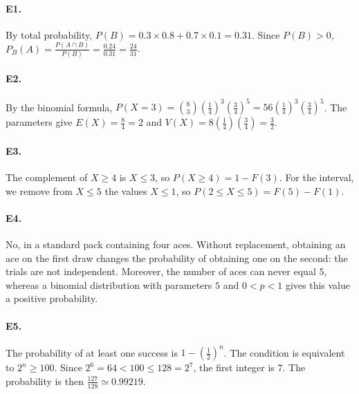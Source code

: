 \paragraph{E1.}By total probability, $P(B)=0.3\times0.8+0.7\times0.1=0.31$. Since $P(B)>0$, $P_B(A)=\frac{P(A\cap B)}{P(B)}=\frac{0.24}{0.31}=\frac{24}{31}$.

\paragraph{E2.}By the binomial formula, $P(X=3)=\binom{8}{3}(\frac{1}{4})^3(\frac{3}{4})^5=56(\frac{1}{4})^3(\frac{3}{4})^5$. The parameters give $E(X)=\frac{8}{4}=2$ and $V(X)=8(\frac{1}{4})(\frac{3}{4})=\frac{3}{2}$.

\paragraph{E3.}The complement of $X\ge4$ is $X\le3$, so $P(X\ge4)=1-F(3)$. For the interval, we remove from $X\le5$ the values $X\le1$, so $P(2\le X\le5)=F(5)-F(1)$.

\paragraph{E4.}No, in a standard pack containing four aces. Without replacement, obtaining an ace on the first draw changes the probability of obtaining one on the second: the trials are not independent. Moreover, the number of aces can never equal $5$, whereas a binomial distribution with parameters $5$ and $0<p<1$ gives this value a positive probability.

\paragraph{E5.}The probability of at least one success is $1-(\frac{1}{2})^n$. The condition is equivalent to $2^n\ge100$. Since $2^6=64<100\le128=2^7$, the first integer is $7$. The probability is then $\frac{127}{128}\simeq0.99219$.

